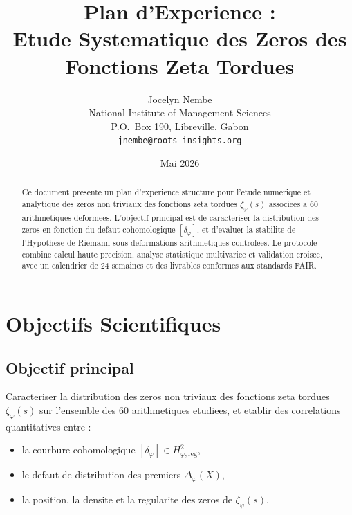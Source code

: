 \documentclass[11pt,a4paper]{article}
\title{\textbf{Plan d'Experience :}\\[0.5em] Etude Systematique des Zeros des Fonctions Zeta Tordues}
\author{Jocelyn Nembe \\[0.5em]
	\small National Institute of Management Sciences \\
	\small P.O.\ Box 190, Libreville, Gabon \\
	\small \texttt{jnembe@roots-insights.org}}
\date{Mai 2026}
\begin{document}
	\maketitle
	\thispagestyle{empty}
	
	\begin{abstract}
		\noindent Ce document presente un plan d'experience structure pour l'etude numerique et analytique des zeros non triviaux des fonctions zeta tordues $\zeta_\varphi(s)$ associees a 60 arithmetiques deformees. L'objectif principal est de caracteriser la distribution des zeros en fonction du defaut cohomologique $[\delta_\varphi]$, et d'evaluer la stabilite de l'Hypothese de Riemann sous deformations arithmetiques controlees. Le protocole combine calcul haute precision, analyse statistique multivariee et validation croisee, avec un calendrier de 24 semaines et des livrables conformes aux standards FAIR.
	\end{abstract}
	
	\tableofcontents
	\newpage
	
	\section{Objectifs Scientifiques}
	\label{sec:objectifs}
	
	\subsection{Objectif principal}
	Caracteriser la distribution des zeros non triviaux des fonctions zeta tordues $\zeta_\varphi(s)$ sur l'ensemble des 60 arithmetiques etudiees, et etablir des correlations quantitatives entre :
	\begin{itemize}
		\item la courbure cohomologique $[\delta_\varphi] \in H^2_{\varphi,\mathrm{reg}}$,
		\item le defaut de distribution des premiers $\Delta_\varphi(X)$,
		\item la position, la densite et la regularite des zeros de $\zeta_\varphi(s)$.
	\end{itemize}
	
\end{document}
